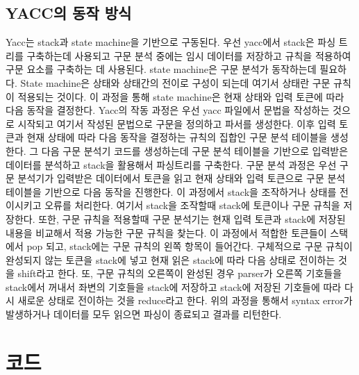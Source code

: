 \documentclass{article}
\begin{document}
\subsection{YACC의 동작 방식}
Yacc는 stack과 state machine을 기반으로 구동된다. 우선 yacc에서 stack은 파싱 트리를 구축하는데 사용되고 구문 분석 중에는 임시 데이터를 저장하고 규칙을 적용하여 구문 요소를 구축하는 데 사용된다. state machine은 구문 분석가 동작하는데 필요하다. State machine은 상태와 상태간의 전이로 구성이 되는데 여기서 상태란 구문 규칙이 적용되는 것이다. 이 과정을 통해 state machine은 현재 상태와 입력 토큰에 따라 다음 동작을 결정한다. Yacc의 작동 과정은 우선 yacc 파일에서 문법을 작성하는 것으로 시작되고 여기서 작성된 문법으로 구문을 정의하고 파서를 생성한다. 이후 입력 토큰과 현재 상태에 따라 다음 동작을 결정하는 규칙의 집합인 구문 분석 테이블을 생성한다. 그 다음 구문 분석기 코드를 생성하는데 구문 분석 테이블을 기반으로 입력받은 데이터를 분석하고 stack을 활용해서 파싱트리를 구축한다. 구문 분석 과정은 우선 구문 분석기가 입력받은 데이터에서 토큰을 읽고 현재 상태와 입력 토큰으로 구문 분석 테이블을 기반으로 다음 동작을 진행한다. 이 과정에서 stack을 조작하거나 상태를 전이시키고 오류를 처리한다. 여기서 stack을 조작할때 stack에 토큰이나 구문 규칙을 저장한다. 또한, 구문 규칙을 적용할때 구문 분석기는 현재 입력 토큰과 stack에 저장된 내용을 비교해서 적용 가능한 구문 규칙을 찾는다. 이 과정에서 적합한 토큰들이 스택에서 pop 되고, stack에는 구문 규칙의 왼쪽 항목이 들어간다. 구체적으로 구문 규칙이 완성되지 않는 토큰을 stack에 넣고 현재 읽은 stack에 따라 다음 상태로 전이하는 것을 shift라고 한다. 또, 구문 규칙의 오른쪽이 완성된 경우 parser가 오른쪽 기호들을 stack에서 꺼내서 좌변의 기호들을 stack에 저장하고 stack에 저장된 기호들에 따라 다시 새로운 상태로 전이하는 것을 reduce라고 한다.  위의 과정을 통해서 syntax error가 발생하거나 데이터를 모두 읽으면 파싱이 종료되고 결과를 리턴한다. 
\newpage

\section{코드}
\end{document}
